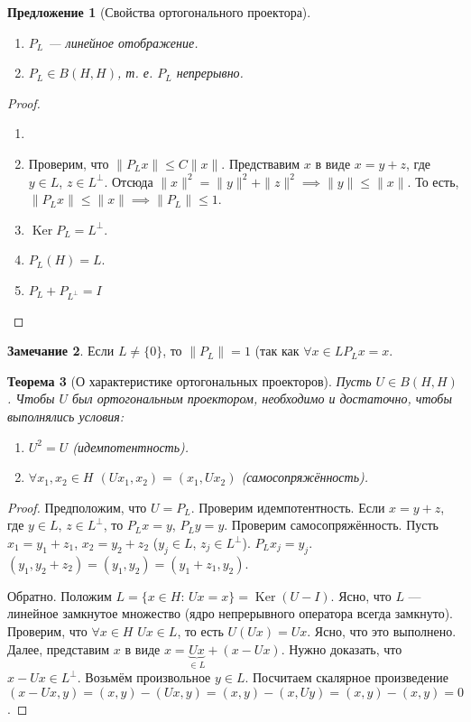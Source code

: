 \documentclass[11pt,openany,a4paper]{scrartcl}
\theoremstyle{plain}
\newtheorem{theorem}{Теорема}[section]
\newtheorem{proposition}[theorem]{Предложение}
\theoremstyle{definition}
\newtheorem{remark}[theorem]{Замечание}
\DeclareMathOperator{\Ker}{Ker}
\begin{document}
\begin{proposition}[Свойства ортогонального проектора]
    \begin{enumerate}
        \item $P_L$ — линейное отображение.
        \item $P_L \in B(H, H)$, т. е. $P_L$ непрерывно.
    \end{enumerate}
\end{proposition}
\begin{proof}
    \begin{enumerate}
        \item 
        \item Проверим, что $\|P_Lx\| \leqslant C\|x\|$. Предствавим $x$ в виде
        $x = y + z$, где $y \in L$, $z \in L^\perp$. Отсюда
        $\|x\|^2 = \|y\|^2 + \|z\|^2 \implies \|y\| \leqslant \|x\|$. То есть,
        $\|P_Lx\| \leqslant \|x\| \implies \|P_L\| \leqslant 1$.
        \item $\Ker P_L = L^\perp$.
        \item $P_L(H) = L$.
        \item $P_L + P_{L^\perp} = I$
    \end{enumerate}
\end{proof}
\begin{remark}
    Если $L \neq \{0\}$, то $\|P_L\| = 1$ (так как $\forall x \in L P_Lx = x$.
\end{remark}

\begin{theorem}[О характеристике ортогональных проекторов]
    Пусть $U \in B(H, H)$. Чтобы $U$ был ортогональным проектором,
    необходимо и достаточно, чтобы выполнялись условия:
    \begin{enumerate}
        \item $U^2 = U$ (идемпотентность).
        \item $\forall x_1, x_2 \in H$ $(Ux_1, x_2) = (x_1, Ux_2)$
        (самосопряжённость).
    \end{enumerate}
\end{theorem}
\begin{proof}
    Предположим, что $U = P_L$. Проверим идемпотентность.
    Если $x = y + z$, где $y \in L$, $z \in L^\perp$, то $P_Lx = y$, $P_Ly = y$.
    Проверим самосопряжённость. Пусть $x_1 = y_1 + z_1$, $x_2 = y_2 + z_2$
    ($y_j \in L$, $z_j \in L^\perp$). $P_Lx_j = y_j$.
    $(y_1, y_2 + z_2) = (y_1, y_2) = (y_1 + z_1, y_2)$.
    
    Обратно. Положим $L = \{x\in H:\, Ux=x\} = \Ker(U-I)$. Ясно, что $L$ — 
    линейное замкнутое множество (ядро непрерывного оператора всегда 
    замкнуто). Проверим, что $\forall x\in H$ $Ux \in L$, то есть $U(Ux) = Ux$.
    Ясно, что это выполнено. Далее, представим $x$ в виде
    $x = \underbrace{Ux}_{\in L} + (x - Ux)$. Нужно доказать, что
    $x - Ux \in L^\perp$. Возьмём произвольное $y \in L$. Посчитаем скалярное 
    произведение $(x - Ux, y) = (x, y) - (Ux, y) = (x, y) - (x, Uy) =
    (x, y) - (x, y) = 0$.
\end{proof}
\end{document}
